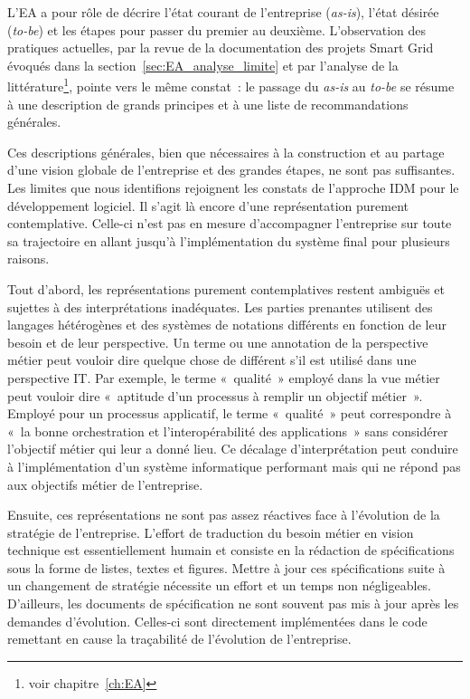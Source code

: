 L'EA a pour rôle de décrire l'état courant de l'entreprise (\textit{as-is}),
l'état désirée (\textit{to-be}) et les étapes pour passer du premier au
deuxième. L'observation des pratiques actuelles, par la revue de la
documentation des projets Smart Grid évoqués dans la
section~\ref{sec:EA_analyse_limite} et par l'analyse de la
littérature\footnote{voir chapitre~\ref{ch:EA}}, pointe vers le même constat~:
le passage du \textit{as-is} au \textit{to-be} se résume à une description de
grands principes et à une liste de recommandations générales.

Ces descriptions générales, bien que nécessaires à la construction et au
partage d'une vision globale de l'entreprise et des grandes étapes, ne sont pas
suffisantes. Les limites que nous identifions rejoignent les constats de
l'approche IDM pour le développement logiciel. Il s'agit là encore d'une
représentation purement contemplative. Celle-ci n'est pas en mesure
d'accompagner l'entreprise sur toute sa trajectoire en allant jusqu'à
l'implémentation du système final pour plusieurs raisons.

Tout d'abord, les représentations purement contemplatives restent ambiguës et
sujettes à des interprétations inadéquates. Les parties prenantes utilisent des
langages hétérogènes et des systèmes de notations différents en fonction de
leur besoin et de leur perspective. Un terme ou une annotation de la
perspective métier peut vouloir dire quelque chose de différent s'il est
utilisé dans une perspective IT. Par exemple, le terme «~qualité~» employé dans
la vue métier peut vouloir dire «~aptitude d'un processus à remplir un objectif
métier~». Employé pour un processus applicatif, le terme «~qualité~» peut
correspondre à «~la bonne orchestration et l'interopérabilité des
applications~» sans considérer l'objectif métier qui leur a donné lieu. Ce
décalage d'interprétation peut conduire à l'implémentation d'un système
informatique performant mais qui ne répond pas aux objectifs métier de
l'entreprise.

Ensuite, ces représentations ne sont pas assez réactives face à l'évolution de
la stratégie de l'entreprise. L'effort de traduction du besoin métier en vision
technique est essentiellement humain et consiste en la rédaction de
spécifications sous la forme de listes, textes et figures. Mettre à jour ces
spécifications suite à un changement de stratégie nécessite un effort et un
temps non négligeables. D'ailleurs, les documents de spécification ne sont
souvent pas mis à jour après les demandes d'évolution. Celles-ci sont
directement implémentées dans le code remettant en cause la traçabilité de
l'évolution de l'entreprise.


